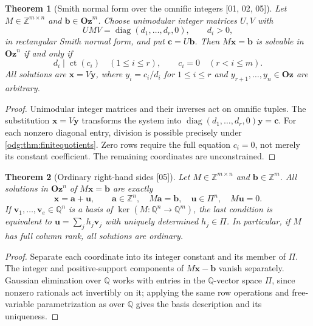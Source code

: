 \documentclass[11pt,oneside]{article}
\numberwithin{equation}{section}
\newtheorem{theorem}{Theorem}[section]
\theoremstyle{definition}
\theoremstyle{remark}
\newcommand{\Oz}{\mathbf{Oz}}
\newcommand{\Z}{\mathbb Z}
\newcommand{\Q}{\mathbb Q}
\newcommand{\ct}{\operatorname{ct}}
\newcommand{\diag}{\operatorname{diag}}
\newcommand{\src}[1]{\textup{\textsf{\small[#1]}}}
\begin{document}
\begin{theorem}[Smith normal form over the omnific integers \src{01, 02, 05}]\label{odg:thm:smith}
Let $M\in\Z^{m\times n}$ and $\mathbf b\in\Oz^m$. Choose unimodular
integer matrices $U,V$ with
\[
 UMV=\diag(d_1,\ldots,d_r,0),\qquad d_i>0,
\]
in rectangular Smith normal form, and put $\mathbf c=U\mathbf b$.
Then $M\mathbf x=\mathbf b$ is solvable in $\Oz^n$ if and only if
\begin{equation}\label{odg:eq:smithcriterion}
 d_i\mid\ct(c_i)\quad(1\leq i\leq r),
 \qquad c_i=0\quad(r<i\leq m).
\end{equation}
All solutions are $\mathbf x=V\mathbf y$, where
$y_i=c_i/d_i$ for $1\le i\le r$ and $y_{r+1},\ldots,y_n\in\Oz$ are
arbitrary.
\end{theorem}
\begin{proof}
Unimodular integer matrices and their inverses act on omnific tuples.
The substitution $\mathbf x=V\mathbf y$ transforms the system into
$\diag(d_1,\ldots,d_r,0)\mathbf y=\mathbf c$. For each nonzero diagonal entry,
division is possible precisely under \cref{odg:thm:finitequotients}. Zero rows
require the full equation $c_i=0$, not merely its constant coefficient. The
remaining coordinates are unconstrained.
\end{proof}

\begin{theorem}[Ordinary right-hand sides \src{05}]\label{odg:thm:linear}
Let $M\in\Z^{m\times n}$ and $\mathbf b\in\Z^m$. All solutions in $\Oz^n$
of $M\mathbf x=\mathbf b$ are exactly
\[
 \mathbf x=\mathbf a+\mathbf u,
 \qquad \mathbf a\in\Z^n,\quad M\mathbf a=\mathbf b,
 \quad \mathbf u\in\Pi^n,\quad M\mathbf u=0.
\]
If $\mathbf v_1,\ldots,\mathbf v_e\in\Q^n$ is a basis of
$\ker(M:\Q^n\to\Q^m)$, the last condition is equivalent to
$\mathbf u=\sum_{j}h_j\mathbf v_j$ with uniquely determined $h_j\in\Pi$.
In particular, if $M$ has full column rank, all solutions are ordinary.
\end{theorem}
\begin{proof}
Separate each coordinate into its integer constant and its member of $\Pi$.
The integer and positive-support components of $M\mathbf x-\mathbf b$
vanish separately. Gaussian elimination over $\Q$ works with entries in the
$\Q$-vector space $\Pi$, since nonzero rationals act invertibly on it;
applying the same row operations and free-variable parametrization as over
$\Q$ gives the basis description and its uniqueness.
\end{proof}
\end{document}
